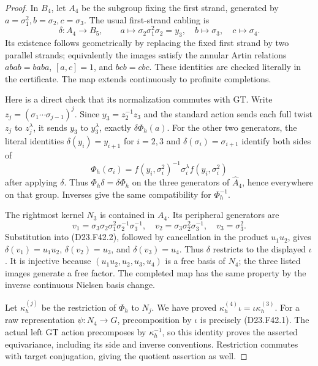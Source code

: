 \begin{proof}
In $B_4$, let $A_4$ be the subgroup fixing the first strand,
generated by $a=\sigma_1^2,b=\sigma_2,c=\sigma_3$.
The usual first-strand cabling is
\[
 \delta:A_4\longrightarrow B_5,\qquad
 a\longmapsto\sigma_2\sigma_1^2\sigma_2=y_3,
 \quad b\longmapsto\sigma_3,\quad c\longmapsto\sigma_4.
                                                        \tag{D23.F42.2}
\]
Its existence follows geometrically by replacing the fixed
first strand by two parallel strands; equivalently the
images satisfy the annular Artin relations
$abab=baba$, $[a,c]=1$, and $bcb=cbc$.
These identities are checked literally in the certificate.
The map extends continuously to profinite completions.

Here is a direct check that its normalization commutes with
GT. Write $z_j=(\sigma_1\cdots\sigma_{j-1})^j$.
Since $y_3=z_2^{-1}z_3$ and the standard action sends each
full twist $z_j$ to $z_j^\lambda$, it sends $y_3$ to
$y_3^\lambda$, exactly $\delta\Phi_h(a)$.
For the other two generators, the literal identities
$\delta(y_i)=y_{i+1}$ for $i=2,3$ and
$\delta(\sigma_i)=\sigma_{i+1}$ identify both sides of
\[
 \Phi_h(\sigma_i)=f(y_i,\sigma_i^2)^{-1}
                         \sigma_i^\lambda f(y_i,\sigma_i^2)
\]
after applying $\delta$. Thus
$\Phi_h\delta=\delta\Phi_h$ on the three generators of
$\widehat A_4$, hence everywhere on that group. Inverses
give the same compatibility for $\Phi_h^{-1}$.

The rightmost kernel $N_3$ is contained in $A_4$. Its
peripheral generators are
\[
 v_1=\sigma_3\sigma_2\sigma_1^2\sigma_2^{-1}\sigma_3^{-1},
 \quad v_2=\sigma_3\sigma_2^2\sigma_3^{-1},
 \quad v_3=\sigma_3^2.
\]
Substitution into (D23.F42.2), followed by cancellation in
the product $u_1u_2$, gives
$\delta(v_1)=u_1u_2$, $\delta(v_2)=u_3$, and
$\delta(v_3)=u_4$. Thus $\delta$ restricts to the displayed
$\iota$. It is injective because
$(u_1u_2,u_2,u_3,u_4)$ is a free basis of $N_4$; the three
listed images generate a free factor. The completed map
has the same property by the inverse continuous Nielsen
basis change.

Let $\kappa_h^{(j)}$ be the restriction of $\Phi_h$ to
$N_j$. We have proved
$\kappa_h^{(4)}\iota=\iota\kappa_h^{(3)}$.
For a raw representation $\psi:N_4\to G$, precomposition
by $\iota$ is precisely (D23.F42.1). The actual left GT
action precomposes by $\kappa_h^{-1}$, so this identity
proves the asserted equivariance, including its side and
inverse conventions. Restriction commutes with target
conjugation, giving the quotient assertion as well.
\end{proof}

